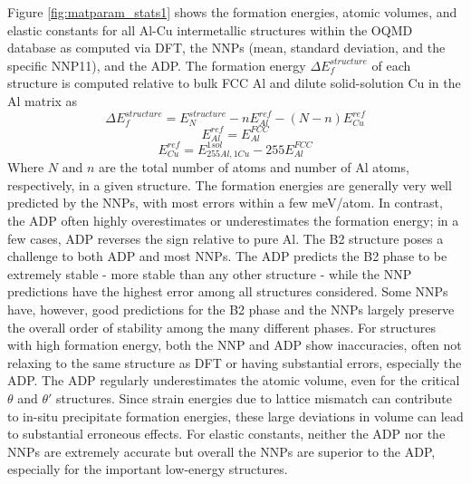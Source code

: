 \documentclass{article}
\begin{document}
Figure \ref{fig:matparam_stats1} shows the formation energies, atomic volumes, and elastic constants for all Al-Cu intermetallic structures within the OQMD database as computed via DFT, the NNPs (mean, standard deviation, and the specific NNP11), and the ADP.
The formation energy $\Delta E^{structure}_f$ of each structure is computed relative to bulk FCC Al and dilute solid-solution Cu in the Al matrix as
\begin{equation} \label{eqn:formE_structure}
\Delta E^{structure}_f = E^{structure}_N - nE^{ref}_{Al}-(N-n)E^{ref}_{Cu}
\end{equation}
\begin{equation} \label{eqn:formRef_Al}
E^{ref}_{Al} = E^{FCC}_{Al}
\end{equation}
\begin{equation} \label{eqn:formRef_Cu}
E^{ref}_{Cu} = E^{1sol}_{255Al,1Cu} - 255E^{FCC}_{Al}
\end{equation}
Where $N$ and $n$ are the total number of atoms and number of Al atoms, respectively, in a given structure.  The formation energies are generally very well predicted by the NNPs, with most errors within a few meV/atom.  In contrast, the ADP often highly overestimates or underestimates the formation energy;
in a few cases, ADP reverses the sign relative to pure Al.  The B2 structure poses a challenge to both ADP and most NNPs.  The ADP predicts the B2 phase to be extremely stable - more stable than any other structure - while the NNP predictions have the highest error among all structures considered.  Some NNPs have, however, good predictions for the B2 phase and the NNPs largely preserve the overall order of stability among the many different phases.  For structures with high formation energy, both the NNP and ADP show inaccuracies, often not relaxing to the same structure as DFT or having substantial errors, especially the ADP.  The ADP regularly underestimates the atomic volume, even for the critical $\theta$ and $\theta'$ structures.  Since strain energies due to lattice mismatch can contribute to in-situ precipitate formation energies, these large deviations in volume can lead to substantial erroneous effects.  
For elastic constants, neither the ADP nor the NNPs are extremely accurate but overall the NNPs are superior to the ADP, especially for the important low-energy structures. 
\end{document}
